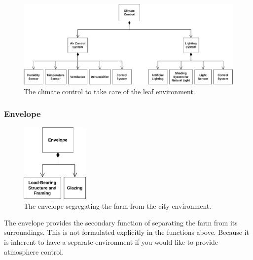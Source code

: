 \begin{figure}[htbp]
  \centering
  \includegraphics[width=\textwidth]{img/architecture/climate.pdf}
  \caption{The climate control to take care of the leaf environment.}
  \label{fig:climate}
\end{figure}

\pagebreak

\subsubsection{Envelope}
\begin{figure}
	\includegraphics[width=0.3\textwidth]{img/architecture/envelope.pdf}
	\caption{The envelope segregating the farm from the city environment.}
	\label{wfig:envelope}
\end{figure} 
The envelope provides the secondary function of separating the farm from its surroundings.
This is not formulated explicitly in the functions above.
Because it is inherent to have a separate environment if you would like to provide atmosphere control.
